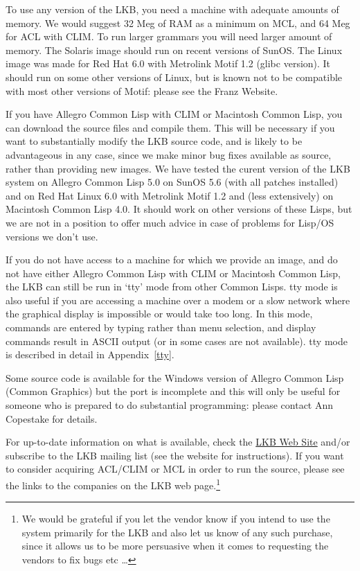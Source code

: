 \documentclass[12pt]{report}
\begin{document}
To use any version of the LKB, 
you need a machine with adequate amounts of memory.
We would suggest 32 Meg of RAM as a minimum on MCL, 
and 64 Meg for ACL with CLIM.
To run larger grammars
you will need larger amount of memory.  
The Solaris image should run on recent versions of SunOS.
The Linux image was made for Red Hat 6.0 with Metrolink Motif 1.2
(glibc version).  It should run on some other versions of Linux, but
is known not to be compatible with most other versions of Motif: 
please see the Franz Website.

If you have Allegro Common Lisp with CLIM or Macintosh Common Lisp, you 
can download the source files
and compile them.  This will be necessary
if you want to substantially
modify the LKB source code, and is likely to be
advantageous in any case, since we make minor bug fixes available
as source, rather than providing new images.
We have tested the curent version of the LKB
system on Allegro Common Lisp 5.0 on SunOS 5.6 
(with all patches installed)
and on Red Hat Linux 6.0 with Metrolink Motif 1.2
and (less extensively) on 
Macintosh Common Lisp 4.0.
It should work on other versions of these Lisps, but we are not in a position
to offer much advice in case of problems for Lisp/OS versions
we don't use.

If you do not have access to a machine for which we provide an image,
and do not have either Allegro Common Lisp with CLIM or Macintosh Common
Lisp, the LKB can still be run in `tty' mode from other Common Lisps.
tty mode is also useful if you are accessing a machine over a 
modem or a slow network
where the graphical display is impossible or would take too long.
In this mode, commands are entered by typing rather than menu selection,
and display commands result in ASCII output (or in some cases are
not available).
tty mode is described in detail in Appendix~\ref{tty}.

Some source code is available for 
the Windows version of Allegro Common Lisp (Common Graphics) but the port 
is incomplete and this will only be useful for someone who is prepared
to do substantial programming: please contact Ann Copestake for details.

For up-to-date information on what is available, check the 
\href{http://www-csli.stanford.edu/~aac/lkb.html}{LKB Web Site}
and/or subscribe to the LKB mailing list (see the website for instructions).
If you want to consider acquiring ACL/CLIM or MCL in order to run the source,
please see the links to the companies on the LKB web page.\footnote{We 
would be grateful if you let the vendor know if you intend to use the
system primarily for the LKB
and also let us know of any such purchase, since it allows us to
be more persuasive when it comes to requesting the vendors 
to fix bugs etc \ldots}
\end{document}
